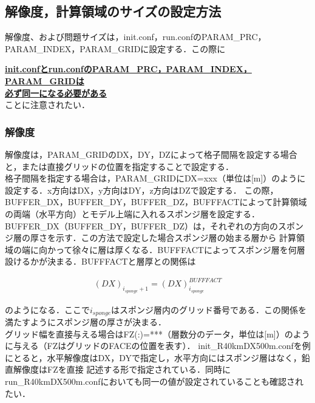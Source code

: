 \subsection{解像度，計算領域のサイズの設定方法}
解像度、および問題サイズは，init.conf，run.confのPARAM\_PRC，PARAM\_INDEX，PARAM\_GRIDに設定する．この際に

\underline{{\bf init.confとrun.confのPARAM\_PRC，PARAM\_INDEX，PARAM\_GRIDは}}\\
\underline{{\bf 必ず同一になる必要がある}}\\
ことに注意されたい．\\

\subsubsection{解像度}
解像度は，PARAM\_GRIDのDX，DY，DZによって格子間隔を設定する場合と，または直接グリッドの位置を指定することで設定する．\\
格子間隔を指定する場合は，PARAM\_GRIDにDX=xxx（単位は[m]）のように設定する．x方向はDX，y方向はDY，z方向はDZで設定する．
この際，BUFFER\_DX，BUFFER\_DY，BUFFER\_DZ，BUFFFACTによって計算領域の両端（水平方向）とモデル上端に入れるスポンジ層を設定する．
BUFFER\_DX（BUFFER\_DY，BUFFER\_DZ）は，それぞれの方向のスポンジ層の厚さを示す．この方法で設定した場合スポンジ層の始まる層から
計算領域の端に向かって徐々に層は厚くなる．BUFFFACTによってスポンジ層を何層設けるかが決まる．BUFFFACTと層厚との関係は

\begin{eqnarray}
(DX)_{i_{sponge}+1}=(DX)_{i_{sponge}}^{BUFFFACT}
\label{eq3.1}
\end{eqnarray}

のようになる．ここで$i_{sponge}$はスポンジ層内のグリッド番号である．この関係を満たすようにスポンジ層の厚さが決まる．\\
グリッド幅を直接与える場合はFZ(:)=***（層数分のデータ，単位は[m]）のように与える（FZはグリッドのFACEの位置を表す）．
init\_R40kmDX500m.confを例にとると，水平解像度はDX，DYで指定し，水平方向にはスポンジ層はなく，鉛直解像度はFZを直接
記述する形で指定されている．同時にrun\_R40kmDX500m.confにおいても同一の値が設定されていることも確認されたい．


